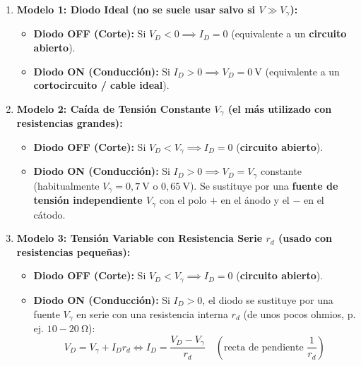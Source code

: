 \begin{metodo}
\begin{enumerate}[leftmargin=*]
    \item \textbf{Modelo 1: Diodo Ideal (no se suele usar salvo si $V \gg V_\gamma$):}
    \begin{itemize}
        \item \textbf{Diodo OFF (Corte):} Si $V_D < 0 \implies I_D = 0$ (equivalente a un \textbf{circuito abierto}).
        \item \textbf{Diodo ON (Conducción):} Si $I_D > 0 \implies V_D = 0\ \si{\volt}$ (equivalente a un \textbf{cortocircuito / cable ideal}).
    \end{itemize}
    \item \textbf{Modelo 2: Caída de Tensión Constante $V_\gamma$ (el más utilizado con resistencias grandes):}
    \begin{itemize}
        \item \textbf{Diodo OFF (Corte):} Si $V_D < V_\gamma \implies I_D = 0$ (\textbf{circuito abierto}).
        \item \textbf{Diodo ON (Conducción):} Si $I_D > 0 \implies V_D = V_\gamma$ constante (habitualmente $V_\gamma = 0{,}7\ \si{\volt}$ o $0{,}65\ \si{\volt}$). Se sustituye por una \textbf{fuente de tensión independiente $V_\gamma$} con el polo $+$ en el ánodo y el $-$ en el cátodo.
    \end{itemize}
    \item \textbf{Modelo 3: Tensión Variable con Resistencia Serie $r_d$ (usado con resistencias pequeñas):}
    \begin{itemize}
        \item \textbf{Diodo OFF (Corte):} Si $V_D < V_\gamma \implies I_D = 0$ (\textbf{circuito abierto}).
        \item \textbf{Diodo ON (Conducción):} Si $I_D > 0$, el diodo se sustituye por una fuente $V_\gamma$ en serie con una resistencia interna $r_d$ (de unos pocos ohmios, p. ej. $10 - 20\ \si{\ohm}$):
        \begin{equation}
            V_D = V_\gamma + I_D r_d \iff I_D = \frac{V_D - V_\gamma}{r_d} \quad \left(\text{recta de pendiente } \frac{1}{r_d}\right)
        \end{equation}
    \end{itemize}
\end{enumerate}
\end{metodo}

